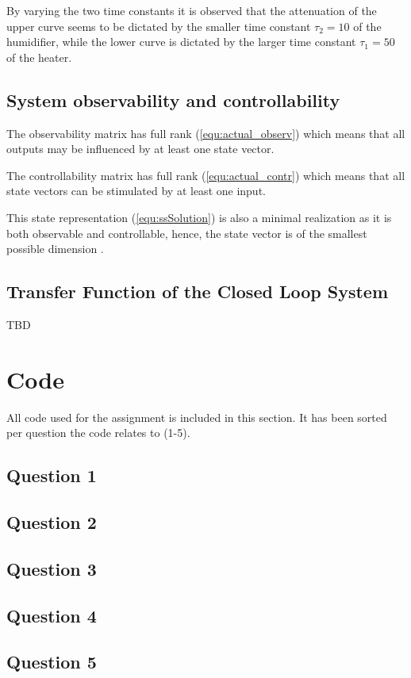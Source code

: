 \documentclass[a4paper, titlepage]{article}
\begin{document}
By varying the two time constants it is observed that the attenuation of the upper curve seems to be dictated by the smaller time constant $\tau_{2}=10$ of the humidifier, while the lower curve is dictated by the larger time constant $\tau_{1}=50$ of the heater. 

\subsection{System observability and controllability}

The observability matrix has full rank (\ref{equ:actual_observ}) which means that all outputs may be influenced by at least one state vector.

The controllability matrix has full rank (\ref{equ:actual_contr}) which means that all state vectors can be stimulated by at least one input.

This state representation (\ref{equ:ssSolution}) is also a minimal realization as it is both observable and controllable, hence, the state vector is of the smallest possible dimension \cite [p. 46]{glad00}.

\subsection{Transfer Function of the Closed Loop System}

TBD

\clearpage


\clearpage

\appendix

\section{Code}
All code used for the assignment is included in this section.
It has been sorted per question the code relates to (1-5).

\subsection{Question 1}

\clearpage

\subsection{Question 2}

\clearpage

\subsection{Question 3}

\clearpage

\subsection{Question 4}

\clearpage

\subsection{Question 5}

\clearpage
\end{document}
